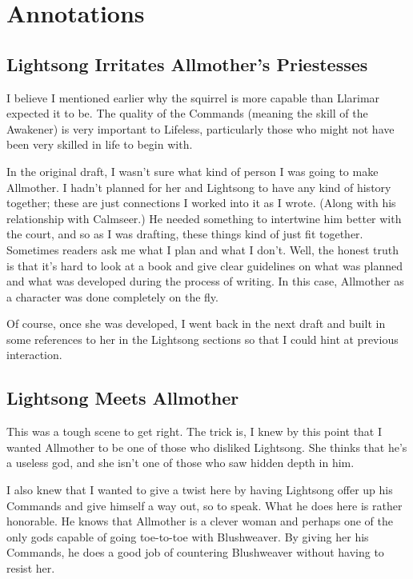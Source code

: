 \section*{Annotations}

\subsection*{Lightsong Irritates Allmother’s Priestesses}

I believe I mentioned earlier why the squirrel is more capable than Llarimar expected it to be. The quality of the Commands (meaning the skill of the Awakener) is very important to Lifeless, particularly those who might not have been very skilled in life to begin with.

In the original draft, I wasn’t sure what kind of person I was going to make Allmother. I hadn’t planned for her and Lightsong to have any kind of history together; these are just connections I worked into it as I wrote. (Along with his relationship with Calmseer.) He needed something to intertwine him better with the court, and so as I was drafting, these things kind of just fit together. Sometimes readers ask me what I plan and what I don’t. Well, the honest truth is that it’s hard to look at a book and give clear guidelines on what was planned and what was developed during the process of writing. In this case, Allmother as a character was done completely on the fly.

Of course, once she was developed, I went back in the next draft and built in some references to her in the Lightsong sections so that I could hint at previous interaction.

\subsection*{Lightsong Meets Allmother}

This was a tough scene to get right. The trick is, I knew by this point that I wanted Allmother to be one of those who disliked Lightsong. She thinks that he’s a useless god, and she isn’t one of those who saw hidden depth in him.

I also knew that I wanted to give a twist here by having Lightsong offer up his Commands and give himself a way out, so to speak. What he does here is rather honorable. He knows that Allmother is a clever woman and perhaps one of the only gods capable of going toe-to-toe with Blushweaver. By giving her his Commands, he does a good job of countering Blushweaver without having to resist her.

